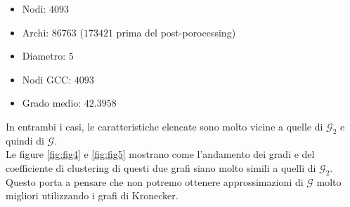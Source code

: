 \documentclass[12pt]{scrartcl}
\begin{document}
\begin{itemize}
	\item Nodi: $4093$ 
	\item Archi: $86763$ ($173421$ prima del post-porocessing)
	\item Diametro: $5$
	\item Nodi GCC: $4093$
	\item Grado medio: $42.3958$
\end{itemize}

In entrambi i casi, le caratteristiche elencate sono molto vicine a quelle di $\mathcal{G}_2$ e quindi di $\mathcal{G}$.\\
Le figure \ref{fig:fig4} e \ref{fig:fig5} mostrano come l'andamento dei gradi e del coefficiente di clustering di questi due grafi siano molto simili a quelli di $\mathcal{G}_2$. Questo porta a pensare che non potremo ottenere approssimazioni di $\mathcal{G}$ molto migliori utilizzando i grafi di Kronecker.
\end{document}
